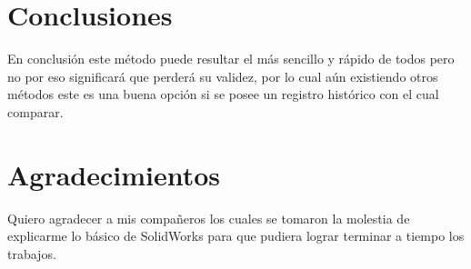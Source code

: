     
    
    \section{Conclusiones}
    
    En conclusión este método puede resultar el más sencillo y rápido de todos pero no por eso significará que perderá su validez, por lo cual aún existiendo otros métodos este es una buena opción si se posee un registro histórico con el cual comparar.
    
    \section{Agradecimientos}
    
    Quiero agradecer a mis compañeros los cuales se tomaron la molestia de explicarme lo básico de SolidWorks para que pudiera lograr terminar a tiempo los trabajos.
    
    
